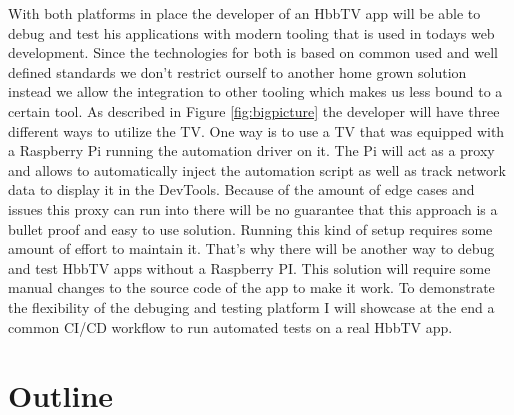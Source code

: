 With both platforms in place the developer of an HbbTV app will be able to debug and test his applications
with modern tooling that is used in todays web development. Since the technologies for both is based on
common used and well defined standards we don't restrict ourself to another home grown solution instead we
allow the integration to other tooling which makes us less bound to a certain tool. As described in Figure
\ref{fig:bigpicture} the developer will have three different ways to utilize the TV. One way is to use
a TV that was equipped with a Raspberry Pi running the automation driver on it. The Pi will act as a proxy
and allows to automatically inject the automation script as well as track network data to display it in the
DevTools. Because of the amount of edge cases and issues this proxy can run into there will be no guarantee
that this approach is a bullet proof and easy to use solution. Running this kind of setup requires some amount
of effort to maintain it. That's why there will be another way to debug and test HbbTV apps without a
Raspberry PI. This solution will require some manual changes to the source code of the app to make it work.
To demonstrate the flexibility of the debuging and testing platform I will showcase at the end a common
CI/CD workflow to run automated tests on a real HbbTV app.

\section{Outline\label{sec:outline}}


